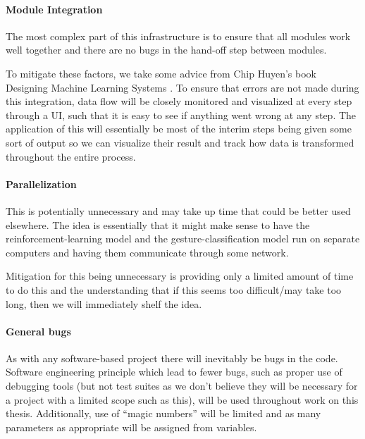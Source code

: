 \paragraph{Module Integration}
The most complex part of this infrastructure is to ensure that all modules work well together and there are no bugs in the hand-off step between modules.

To mitigate these factors, we take some advice from Chip Huyen's book Designing Machine Learning Systems \cite{dmlsbook2022}.
To ensure that errors are not made during this integration, data flow will be closely monitored and visualized at every step through a UI, such that it is easy to see if anything went wrong at any step.
The application of this will essentially be most of the interim steps being given some sort of output so we can visualize their result and track how data is transformed throughout the entire process.

\paragraph{Parallelization}
This is potentially unnecessary and may take up time that could be better used elsewhere.
The idea is essentially that it might make sense to have the reinforcement-learning model and the gesture-classification model run on separate computers and having them communicate through some network.

Mitigation for this being unnecessary is providing only a limited amount of time to do this and the understanding that if this seems too difficult/may take too long, then we will immediately shelf the idea.

\paragraph{General bugs}
As with any software-based project there will inevitably be bugs in the code.
Software engineering principle which lead to fewer bugs, such as proper use of debugging tools (but not test suites as we don't believe they will be necessary for a project with a limited scope such as this), will be used throughout work on this thesis.
Additionally, use of ``magic numbers'' will be limited and as many parameters as appropriate will be assigned from variables.
